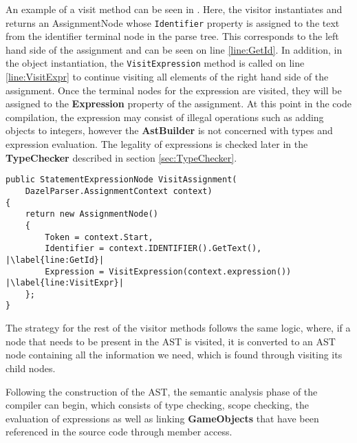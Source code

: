An example of a visit method can be seen in .
Here, the visitor instantiates and returns an AssignmentNode whose \texttt{Identifier} property is assigned to the text from the identifier terminal node in the parse tree. 
This corresponds to the left hand side of the assignment and can be seen on line \ref{line:GetId}. In addition, in the object instantiation, the \texttt{VisitExpression} method is called on line \ref{line:VisitExpr} to continue visiting all elements of the right hand side of the assignment. Once the terminal nodes for the expression are visited, they will be assigned to the \textbf{Expression} property of the assignment. At this point in the code compilation, the expression may consist of illegal operations such as adding objects to integers, however the \textbf{AstBuilder} is not concerned with types and expression evaluation. The legality of expressions is checked later in the \textbf{TypeChecker} described in section \ref{sec:TypeChecker}.

\begin{lstlisting}[language=CSharp, caption={Visit assignment}, label={lst:VisitAssignment},escapechar=|]
public StatementExpressionNode VisitAssignment(
    DazelParser.AssignmentContext context)
{
    return new AssignmentNode()
    {
        Token = context.Start,
        Identifier = context.IDENTIFIER().GetText(), |\label{line:GetId}|
        Expression = VisitExpression(context.expression()) |\label{line:VisitExpr}|
    };
}
\end{lstlisting}

The strategy for the rest of the visitor methods follows the same logic, where, if a node that needs to be present in the AST is visited, it is converted to an AST node containing all the information we need, which is found through visiting its child nodes.

Following the construction of the AST, the semantic analysis phase of the compiler can begin, which consists of type checking, scope checking, the evaluation of expressions as well as linking \textbf{GameObjects} that have been referenced in the source code through member access.
